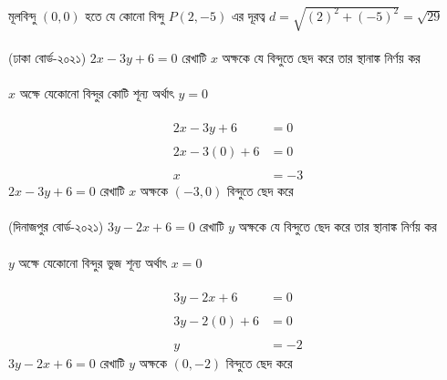 \documentclass{article}
\begin{document}
\\
মূলবিন্দু $(0,0)$ হতে যে কোনো বিন্দু $P(2,-5)$ এর দূরত্ব  $d=\sqrt{(2)^2+(-5)^2}=\sqrt{29}$\\
\\
(ঢাকা বোর্ড-২০২১) $2x-3y+6=0$ রেখাটি  $x$ অক্ষকে যে বিন্দুতে ছেদ করে তার স্থানাঙ্ক নির্ণয় কর \\
\\
 $x$ অক্ষে যেকোনো বিন্দুর কোটি শূন্য অর্থাৎ $y=0$\\
 \\
 \begin{align*}
 	2x-3y+6&=0\\
 	\\
 		2x-3(0)+6&=0\\
 		\\
 		x&=-3
 \end{align*}
$2x-3y+6=0$ রেখাটি  $x$ অক্ষকে $(-3,0)$ বিন্দুতে ছেদ করে \\
\\
(দিনাজপুর  বোর্ড-২০২১) $3y-2x+6=0$ রেখাটি  $y$ অক্ষকে যে বিন্দুতে ছেদ করে তার স্থানাঙ্ক নির্ণয় কর \\
\\
$y$ অক্ষে যেকোনো বিন্দুর ভুজ শূন্য অর্থাৎ $x=0$\\
\\
\begin{align*}
3y-2x+6&=0\\
	\\
3y-2(0)+6&=0\\
	\\
	y&=-2
\end{align*}
$3y-2x+6=0$ রেখাটি  $y$ অক্ষকে $(0,-2)$ বিন্দুতে ছেদ করে \\
\end{document}
